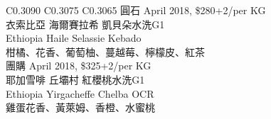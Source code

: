 \documentclass[10pt,a4paper]{article}
\begin{document}
\begin{tabular}{C{0.3090\textwidth} C{0.3075\textwidth} C{0.3065\textwidth}}
{%
圓石 April  2018,  \$280+2/per KG \vspace*{-0.2em} \\ %
衣索比亞  海爾賽拉希 凱貝朵水洗G1 \vspace*{-0.12em} \\ Ethiopia  Haile Selassie Kebado%
 \vspace*{-0.22em} \\ %
\footnotesize 柑橘、花香、葡萄柚、蔓越莓、檸檬皮、紅茶%
\vspace*{0.345em}\\%
團購   April  2018,  \$325+2/per KG \vspace*{-0.2em} \\ %
耶加雪啡 丘壩村 紅櫻桃水洗G1 \vspace*{-0.12em} \\ Ethiopia Yirgacheffe Chelba  OCR%
 \vspace*{-0.22em} \\ %
\footnotesize 雞蛋花香、黃萊姆、香橙、水蜜桃%
}
\end{tabular}
\end{document}

